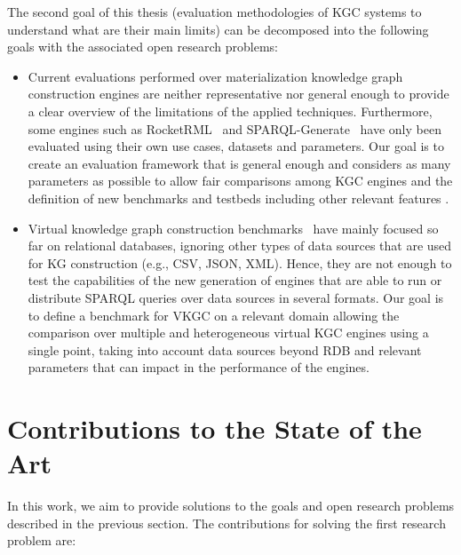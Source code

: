 The second goal of this thesis (evaluation methodologies of KGC systems to understand what are their main limits) can be decomposed into the following goals with the associated open research problems:
\begin{itemize}
    \item Current evaluations performed over materialization knowledge graph construction engines are neither representative nor general enough to provide a clear overview of the limitations of the applied techniques. Furthermore, some engines such as RocketRML~\citep{csimcsek2019rocketrml} and SPARQL-Generate~\citep{lefranccois2017sparql} have only been evaluated using their own use cases, datasets and parameters. Our goal is to create an evaluation framework that is general enough and considers as many parameters as possible to allow fair comparisons among KGC engines and the definition of new benchmarks and testbeds including other relevant features .
    \item Virtual knowledge graph construction benchmarks~\citep{lanti2015npd,bizer2009berlin} have mainly focused so far on relational databases, ignoring other types of data sources that are used for KG construction (e.g., CSV, JSON, XML). Hence, they are not enough to test the capabilities of the new generation of engines that are able to run or distribute SPARQL queries over data sources in several formats. Our goal is to define a benchmark for VKGC on a relevant domain allowing the comparison over multiple and heterogeneous virtual KGC engines using a single point, taking into account data sources beyond RDB and relevant parameters that can impact in the performance of the engines.
\end{itemize}

\section{Contributions to the State of the Art}
In this work, we aim to provide solutions to the goals and open research problems described in the previous section. The contributions for solving the first research problem are:

